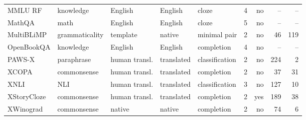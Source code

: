 \begin{tabular}{llllllrrr}
MMLU RF & knowledge & English & English & cloze & 4 & no & -- & -- \\
MathQA & math & English & English & cloze & 5 & no & -- & -- \\
MultiBLiMP & grammaticality & template & native & minimal pair & 2 & no & 46 & 119 \\
OpenBookQA & knowledge & English & English & completion & 4 & no & -- & -- \\
PAWS-X & paraphrase & human transl. & translated & classification & 2 & no & 224 & 2 \\
XCOPA & commonsense & human transl. & translated & completion & 2 & no & 37 & 31 \\
XNLI & NLI & human transl. & translated & classification & 3 & no & 127 & 10 \\
XStoryCloze & commonsense & human transl. & translated & completion & 2 & yes & 189 & 38 \\
XWinograd & commonsense & native & native & completion & 2 & no & 74 & 6 \\
\bottomrule
\end{tabular}
